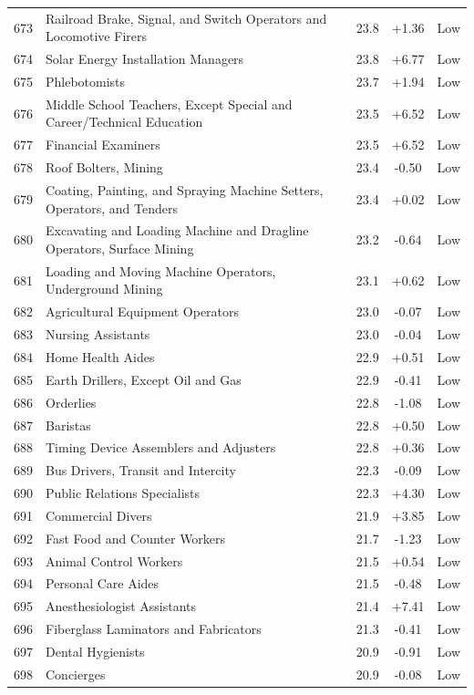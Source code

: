 {\begin{longtable}{rp{7cm}ccc}
673 & Railroad Brake, Signal, and Switch Operators and Locomotive Firers & 23.8 & +1.36 & Low \\
674 & Solar Energy Installation Managers & 23.8 & +6.77 & Low \\
675 & Phlebotomists & 23.7 & +1.94 & Low \\
676 & Middle School Teachers, Except Special and Career/Technical Education & 23.5 & +6.52 & Low \\
677 & Financial Examiners & 23.5 & +6.52 & Low \\
678 & Roof Bolters, Mining & 23.4 & -0.50 & Low \\
679 & Coating, Painting, and Spraying Machine Setters, Operators, and Tenders & 23.4 & +0.02 & Low \\
680 & Excavating and Loading Machine and Dragline Operators, Surface Mining & 23.2 & -0.64 & Low \\
681 & Loading and Moving Machine Operators, Underground Mining & 23.1 & +0.62 & Low \\
682 & Agricultural Equipment Operators & 23.0 & -0.07 & Low \\
683 & Nursing Assistants & 23.0 & -0.04 & Low \\
684 & Home Health Aides & 22.9 & +0.51 & Low \\
685 & Earth Drillers, Except Oil and Gas & 22.9 & -0.41 & Low \\
686 & Orderlies & 22.8 & -1.08 & Low \\
687 & Baristas & 22.8 & +0.50 & Low \\
688 & Timing Device Assemblers and Adjusters & 22.8 & +0.36 & Low \\
689 & Bus Drivers, Transit and Intercity & 22.3 & -0.09 & Low \\
690 & Public Relations Specialists & 22.3 & +4.30 & Low \\
691 & Commercial Divers & 21.9 & +3.85 & Low \\
692 & Fast Food and Counter Workers & 21.7 & -1.23 & Low \\
693 & Animal Control Workers & 21.5 & +0.54 & Low \\
694 & Personal Care Aides & 21.5 & -0.48 & Low \\
695 & Anesthesiologist Assistants & 21.4 & +7.41 & Low \\
696 & Fiberglass Laminators and Fabricators & 21.3 & -0.41 & Low \\
697 & Dental Hygienists & 20.9 & -0.91 & Low \\
698 & Concierges & 20.9 & -0.08 & Low \\

\end{longtable}}
